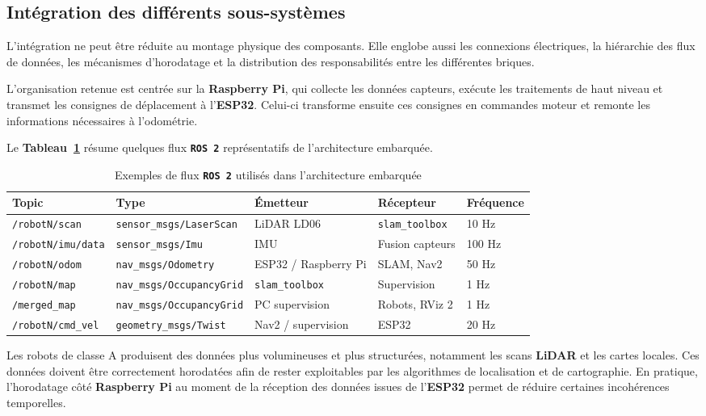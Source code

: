 \documentclass[11pt,a4paper]{report}
\newcommand{\kw}[1]{\textbf{#1}}
\newcommand{\outil}[1]{\textbf{\texttt{#1}}}
\begin{document}
\subsection{Intégration des différents sous-systèmes}

L’intégration ne peut être réduite au montage physique des composants. Elle englobe aussi les connexions électriques, la hiérarchie des flux de données, les mécanismes d’horodatage et la distribution des responsabilités entre les différentes briques.

L’organisation retenue est centrée sur la \kw{Raspberry Pi}, qui collecte les données capteurs, exécute les traitements de haut niveau et transmet les consignes de déplacement à l’\kw{ESP32}. Celui-ci transforme ensuite ces consignes en commandes moteur et remonte les informations nécessaires à l’odométrie.

Le \kw{Tableau~\ref{tab:topics_ros2}} résume quelques flux \outil{ROS 2} représentatifs de l’architecture embarquée.

\begin{table}[H]
\centering
\small
\begin{tabular}{|p{3.2cm}|p{3.6cm}|p{3.2cm}|p{3.2cm}|p{1.8cm}|}
\hline
\textbf{Topic} & \textbf{Type} & \textbf{Émetteur} & \textbf{Récepteur} & \textbf{Fréquence} \\
\hline
\texttt{/robotN/scan} & \texttt{sensor\_msgs/LaserScan} & LiDAR LD06 & \texttt{slam\_toolbox} & 10 Hz \\
\hline
\texttt{/robotN/imu/data} & \texttt{sensor\_msgs/Imu} & IMU & Fusion capteurs & 100 Hz \\
\hline
\texttt{/robotN/odom} & \texttt{nav\_msgs/Odometry} & ESP32 / Raspberry Pi & SLAM, Nav2 & 50 Hz \\
\hline
\texttt{/robotN/map} & \texttt{nav\_msgs/OccupancyGrid} & \texttt{slam\_toolbox} & Supervision & 1 Hz \\
\hline
\texttt{/merged\_map} & \texttt{nav\_msgs/OccupancyGrid} & PC supervision & Robots, RViz 2 & 1 Hz \\
\hline
\texttt{/robotN/cmd\_vel} & \texttt{geometry\_msgs/Twist} & Nav2 / supervision & ESP32 & 20 Hz \\
\hline
\end{tabular}
\caption{Exemples de flux \outil{ROS 2} utilisés dans l’architecture embarquée}
\label{tab:topics_ros2}
\end{table}

Les robots de classe A produisent des données plus volumineuses et plus structurées, notamment les scans \kw{LiDAR} et les cartes locales. Ces données doivent être correctement horodatées afin de rester exploitables par les algorithmes de localisation et de cartographie. En pratique, l’horodatage côté \kw{Raspberry Pi} au moment de la réception des données issues de l’\kw{ESP32} permet de réduire certaines incohérences temporelles.
\end{document}
